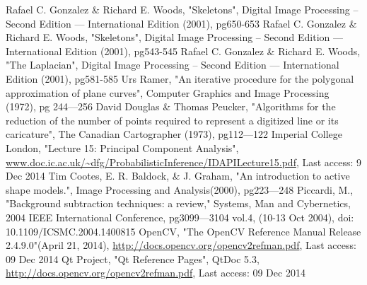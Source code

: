 \documentclass[a4paper, 12pt]{article}
\begin{document}
%
%
\clearpage
\begin{thebibliography}{9}
    Rafael C. Gonzalez \& Richard E. Woods,
    "Skeletons",
    Digital Image Processing -- Second Edition --- International Edition (2001),
    pg650-653
%
    Rafael C. Gonzalez \& Richard E. Woods,
    "Skeletons",
    Digital Image Processing -- Second Edition --- International Edition (2001),
    pg543-545
%
    Rafael C. Gonzalez \& Richard E. Woods,
    "The Laplacian",
    Digital Image Processing -- Second Edition --- International Edition (2001),
    pg581-585
%
    Urs Ramer,
    "An iterative procedure for the polygonal approximation of plane curves",
    Computer Graphics and Image Processing (1972),
    pg 244--–256
%
	David Douglas \& Thomas Peucker,
	"Algorithms for the reduction of the number of points required to represent a 				digitized line or its caricature",
	The Canadian Cartographer (1973),
	pg112--–122
%
	Imperial College London,
	"Lecture 15: Principal Component Analysis",
	\url{www.doc.ic.ac.uk/~dfg/ProbabilisticInference/IDAPILecture15.pdf},
	Last access: 9 Dec 2014
%
	Tim Cootes, E. R. Baldock, \& J. Graham,
 	"An introduction to active shape models.",
 	Image Processing and Analysis(2000),
 	pg223---248
%
	Piccardi, M., "Background subtraction techniques: a review," Systems,
	Man and Cybernetics,
	2004 IEEE International Conference,
	pg3099---3104 vol.4, 		
	(10-13 Oct 2004),
	doi: 10.1109/ICSMC.2004.1400815
%
	OpenCV,
	"The OpenCV Reference Manual
	Release 2.4.9.0"(April 21, 2014),
	\url{http://docs.opencv.org/opencv2refman.pdf},
	Last access: 09 Dec 2014
%
	Qt Project,
	"Qt Reference Pages",
	QtDoc 5.3,
	\url{http://docs.opencv.org/opencv2refman.pdf},
	Last access: 09 Dec 2014
\end{thebibliography}
%
\clearpage
\end{document}
